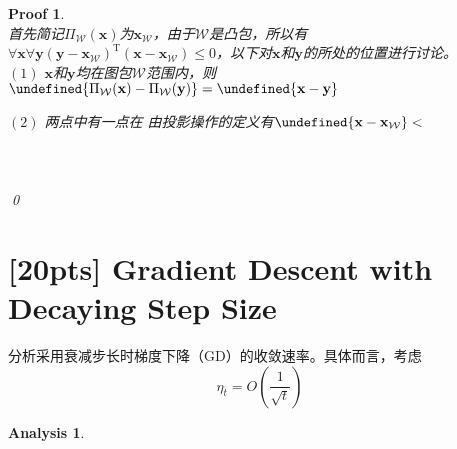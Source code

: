 \documentclass[a4paper,UTF8]{article}
\let\norm\undefined %
\DeclarePairedDelimiter\norm{\lVert}{\rVert}
\numberwithin{equation}{section}
\newtheorem*{myAnalysis}{Analysis}
\newtheorem*{myProof}{Proof}
\begin{document}
\begin{myProof}~\\
首先简记$\Pi_{\mathcal{W}}(\mathbf{x})$为$\mathbf{x}_\mathcal{W}$，由于$\mathcal{W}$是凸包，所以有$\forall \mathbf{x} \forall \mathbf{y}  (\mathbf{y} - \mathbf{x}_\mathcal{W})^\mathrm{T}(\mathbf{x}-\mathbf{x}_\mathcal{W}) \le 0 $，以下对$\mathbf{x}$和$\mathbf{y}$的所处的位置进行讨论。
~\\
$(1)$ $\mathbf{x}$和$\mathbf{y}$均在图包$\mathcal{W}$范围内，则$\norm{\Pi_{\mathcal{W}}(\mathbf{x})-\Pi_{\mathcal{W}}(\mathbf{y})} = \norm{\mathbf{x} - \mathbf{y}}$

$(2)$ 两点中有一点在
由投影操作的定义有$\norm{\mathbf{x}-\mathbf{x}_\mathcal{W}} < $
	~\\
	~\\
	~\\
	~\\	
	\qed
\end{myProof}

\newpage
\section{[20pts] Gradient Descent with Decaying Step Size}
\noindent 分析采用衰减步长时梯度下降（GD）的收敛速率。具体而言，考虑
\[
\eta_t=O\left(\frac{1}{\sqrt{t}}\right)
\]

\begin{myAnalysis}~\\
	~\\
	~\\
	~\\
	~\\	
	~\\
\end{myAnalysis}


\newpage
\end{document}
